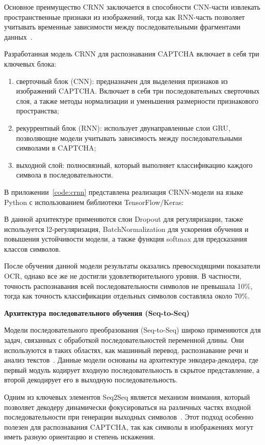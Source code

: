 Основное преимущество CRNN заключается в способности CNN-части извлекать 
пространственные признаки из изображений, тогда как RNN-часть позволяет учитывать 
временные зависимости между последовательными фрагментами данных~\cite{CRNNBook}.

Разработанная модель CRNN для распознавания CAPTCHA включает в себя три ключевых 
блока:
\begin{enumerate}
    \item сверточный блок (CNN): предназначен для выделения признаков из 
    изображений CAPTCHA. Включает в себя три последовательных сверточных слоя, а 
    также методы нормализации и уменьшения размерности признакового пространства;
    \item рекуррентный блок (RNN): использует двунаправленные слои GRU, 
    позволяющие модели учитывать зависимость между последовательными символами в 
    CAPTCHA;
    \item выходной слой: полносвязный, который выполняет классификацию каждого 
    символа в последовательности.
\end{enumerate}

В приложении~\ref{code:crnn} представлена реализация CRNN-модели на языке Python 
с использованием библиотеки TensorFlow/Keras:

В данной архитектуре применяются слои Dropout для регуляризации, также 
используется l2-регуляризация, BatchNormalization для ускорения обучения и 
повышения устойчивости модели, а также функция softmax для предсказания классов 
символов.

После обучения данной модели результаты оказались превосходящими показатели OCR, 
однако все же не достигли удовлетворительного уровня. В частности, точность 
распознавания всей последовательности символов не превышала 10\%, тогда как 
точность классификации отдельных символов составляла около 70\%.

\textbf{Архитектура последовательного обучения (Seq-to-Seq)}

Модели последовательного преобразования (Seq-to-Seq) широко применяются для 
задач, связанных с обработкой последовательностей переменной длины. Они 
используются в таких областях, как машинный перевод, распознавание речи и анализ 
текстов~\cite{Seq2Seq}. Данные модели основаны на архитектуре энкодера-декодера, 
где первый модуль кодирует входную последовательность в скрытое представление, а 
второй декодирует его в выходную последовательность.

Одним из ключевых элементов Seq2Seq является механизм внимания, который позволяет 
декодеру динамически фокусироваться на различных частях входной 
последовательности при генерации выходных символов~\cite{Seq2SeqBook}. Этот 
подход особенно полезен для распознавания CAPTCHA, так как символы в изображениях 
могут иметь разную ориентацию и степень искажения.

